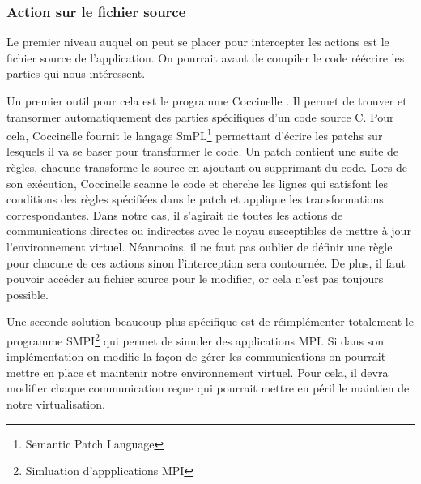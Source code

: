 \subsubsection{Action sur le fichier source}
Le premier niveau auquel on peut se placer pour intercepter les actions est le fichier source de l'application. On pourrait avant de compiler le code réécrire les parties qui nous intéressent.

Un premier outil pour cela est le programme Coccinelle \citep{cocci}. Il permet de trouver et transormer automatiquement des parties spécifiques d'un code source C. Pour cela, Coccinelle fournit le langage SmPL\footnote{Semantic Patch Language} permettant d'écrire les patchs sur lesquels il va se baser pour transformer le code. Un patch contient une suite de règles, chacune transforme le source en ajoutant ou supprimant du code. Lors de son exécution, Coccinelle scanne le code et cherche les lignes qui satisfont les conditions des règles spécifiées dans le patch et applique les transformations correspondantes. Dans notre cas, il s'agirait de toutes les actions de communications directes ou indirectes avec le noyau susceptibles de mettre à jour l'environnement virtuel. Néanmoins, il ne faut pas oublier de définir une règle pour chacune de ces actions sinon l'interception sera contournée. De plus, il faut pouvoir accéder au fichier source pour le modifier, or cela n'est pas toujours possible.

Une seconde solution beaucoup plus spécifique est de réimplémenter totalement le programme SMPI\footnote{Simluation d'appplications MPI} \citep{SMPI, clauss2011single} qui permet de simuler des applications MPI. Si dans son implémentation on modifie la façon de gérer les communications on pourrait mettre en place et maintenir notre environnement virtuel. Pour cela, il devra modifier chaque communication reçue qui pourrait mettre en péril le maintien de notre virtualisation.

